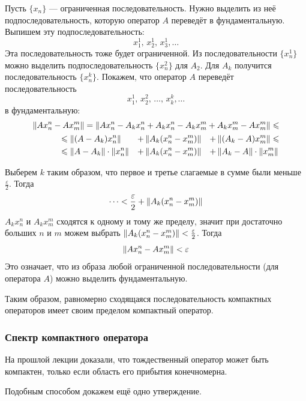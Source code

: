 \documentclass[12pt]{article}
\begin{document}
\begin{enumerate}
				Пусть $\{x_n\}$ --- ограниченная последовательность. Нужно выделить из неё подпоследовательность, которую оператор $A$ 
				переведёт в фундаментальную. Выпишем эту подпоследовательность:
				$$x_1^1,\,x_2^1,\,x_3^1,\dots$$
				Эта последовательность тоже будет ограниченной. Из последовательности $\{x^1_n\}$ можно выделить подпоследовательность 
				$\{x^2_n\}$ для $A_2$. Для $A_k$ получится последовательность $\{x^k_n\}$. Покажем, что оператор $A$ переведёт 
				последовательность
				$$x^1_1,\,x^2_2,\,\dots,\,x^k_k,\dots$$
				в фундаментальную:
				\begin{align*}
					\left\| Ax_n^n - Ax_m^m \right\| = \left\| Ax_n^n - A_kx^n_n + A_kx_n^n - A_kx_m^m + A_kx_m^m - Ax_m^m \right\| \leqslant \\
					\begin{aligned}
						&\leqslant \left\| (A-A_k)x_n^n \right\| &+ &\left\| A_k(x_n^n - x_m^m) \right\| &+ &\left\| (A_k - A)x_m^m \right\| \leqslant \\
						&\leqslant \left\| A-A_k \right\|\cdot\left\| x_n^n \right\| &+ &\left\| A_k(x_n^n - x_m^m) \right\| &+ &\left\| A_k - A \right\| \cdot\left\| x_m^m \right\|
					\end{aligned}
				\end{align*}
		
				Выберем $k$ таким образом, что первое и третье слагаемые в сумме были меньше $\frac{\varepsilon}{2}$. Тогда 
				$$\dots < \frac{\varepsilon}{2} + \left\| A_k(x_n^n - x_m^m) \right\|$$
				$A_k x_n^n$ и $A_k x_m^m$ сходятся к одному и тому же пределу, значит при достаточно больших $n$ и $m$ можем выбрать
				$\left\| A_k(x_n^n - x_m^m) \right\| < \frac{\varepsilon}{2}$. Тогда
				$$\left\| Ax_n^n - Ax_m^m \right\| < \varepsilon$$
				Это означает, что из образа любой ограниченной последовательности (для оператора $A$) можно выделить фундаментальную.
		
				Таким образом, равномерно сходящаяся последовательность компактных операторов 
				имеет своим пределом компактный оператор.
			\end{enumerate}


		\subsubsection{Спектр компактного оператора}

			На прошлой лекции доказали, что тождественный оператор может быть компактен, только если область его прибытия конечномерна.

			Подобным способом докажем ещё одно утверждение.
	
\end{document}
